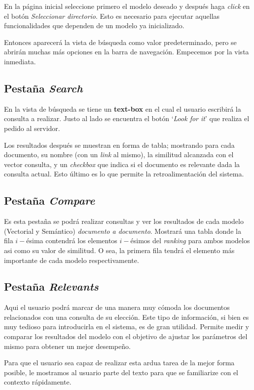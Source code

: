 \documentclass{llncs}
\begin{document}
  En la página inicial seleccione primero el modelo deseado y después haga \emph{click} en el botón \emph{Seleccionar directorio}. Esto es necesario para ejecutar aquellas funcionalidades que dependen de un modelo ya inicializado.

  Entonces aparecerá la vista de búsqueda como valor predeterminado, pero se abrirán muchas más opciones en la barra de navegación. Empecemos por la vista inmediata.

  \subsection{Pestaña \emph{Search}}
    En la vista de búsqueda se tiene un \textbf{text-box} en el cual el usuario escribirá la consulta a realizar. Justo al lado se encuentra el botón `\emph{Look for it}' que realiza el pedido al servidor.

    Los resultados después se muestran en forma de tabla; mostrando para cada documento, su nombre (con un \emph{link} al mismo), la similitud alcanzada con el vector consulta, y un \emph{checkbox} que indica si el documento es relevante dada la consulta actual. Esto último es lo que permite la retroalimentación del sistema.

  \subsection{Pestaña \emph{Compare}}

    Es esta pestaña se podrá realizar consultas y ver los resultados de cada modelo (Vectorial y Semántico) \emph{documento a documento}. Mostrará una tabla donde la fila $i-$ésima contendrá los elementos $i-$ésimos del \emph{ranking} para ambos modelos asi como su valor de similitud. O sea, la primera fila tendrá el elemento más importante de cada modelo respectivamente.

  \subsection{Pestaña \emph{Relevants}}

    Aqui el usuario podrá marcar de una manera muy cómoda los documentos relacionados con una consulta de su elección. Este tipo de información, si bien es muy tedioso para introducirla en el sistema, es de gran utilidad. Permite medir y comparar los resultados del modelo con el objetivo de ajustar los parámetros del mismo para obtener un mejor desempeño.

    Para que el usuario sea capaz de realizar esta ardua tarea de la mejor forma posible, le mostramos al usuario parte del texto para que se familiarize con el contexto rápidamente.
\end{document}

